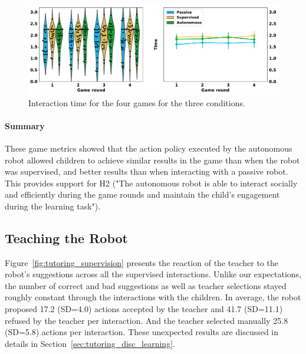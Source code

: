 \begin{figure}[ht]
	\includegraphics[width=1\linewidth]{time.pdf}
	\centering
	\caption{Interaction time for the four games for the three conditions.}
	\label{fig:tutoring_time}
\end{figure}


\paragraph{Summary}

These game metrics showed that the action policy executed by the autonomous robot allowed children to achieve similar results in the game than when the robot was supervised, and better results than when interacting with a passive robot. This provides support for H2 ("The autonomous robot is able to interact socially and efficiently during the game rounds and maintain the child's engagement during the learning task"). 

\subsection{Teaching the Robot}

Figure~\ref{fig:tutoring_supervision} presents the reaction of the teacher to the robot's suggestions across all the supervised interactions. Unlike our expectations, the number of correct and bad suggestions as well as teacher selections stayed roughly constant through the interactions with the children. In average, the robot proposed 17.2 (SD=4.0) actions accepted by the teacher and 41.7 (SD=11.1) refused by the teacher per interaction. And the teacher selected manually 25.8 (SD=5.8) actions per interaction. These unexpected results are discussed in details in Section~\ref{sec:tutoring_disc_learning}.

